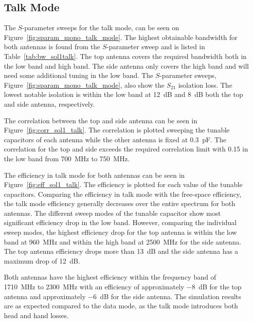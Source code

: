 \FloatBarrier
\subsection{Talk Mode}
The $S$-parameter sweeps for the talk mode, can be seen on Figure~\ref{fig:sparam_mono_talk_mode}. The highest obtainable bandwidth for both antennas is found from the $S$-parameter sweep and is listed in Table~\ref{tab:bw_sol1talk}. The top antenna covers the required bandwidth both in the low band and high band. The side antenna only covers the high band and will need some additional tuning in the low band. The $S$-parameter sweeps, Figure~\ref{fig:sparam_mono_talk_mode}, also show the $S_{21}$ isolation loss. The lowest notable isolation is within the low band at \SI{12}{dB} and \SI{8}{dB} both the top and side antenna, respectively.

The correlation between the top and side antenna can be seen in Figure~\ref{fig:corr_sol1_talk}. The correlation is plotted sweeping the tunable capacitors of each antenna while the other antenna is fixed at \SI{0.3}{pF}. The correlation for the top and side exceeds the required correlation limit with \num{0.15} in the low band from \SI{700}{MHz} to \SI{750}{MHz}.

The efficiency in talk mode for both antennas can be seen in Figure~\ref{fig:eff_sol1_talk}. The efficiency is plotted for each value of the tunable capacitors. Comparing the efficiency in talk mode with the free-space efficiency, the talk mode efficiency generally decreases over the entire spectrum for both antennas. The different sweep modes of the tunable capacitor show most significant efficiency drop in the low band. However, comparing the individual sweep modes, the highest efficiency drop for the top antenna is within the low band at \SI{960}{MHz} and within the high band at \SI{2500}{MHz} for the side antenna. The top antenna efficiency drops more than \SI{13}{dB} and the side antenna has a maximum drop of \SI{12}{dB}.

Both antennas have the highest efficiency within the frequency band of \SI{1710}{MHz} to \SI{2300}{MHz} with an efficiency of approximately \SI{-8}{dB} for the top antenna and approximately \SI{-6}{dB} for the side antenna. 
The simulation results are as expected compared to the data mode, as the talk mode introduces both head and hand losses.

